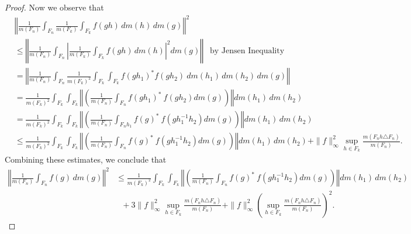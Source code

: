 \documentclass[10pt,a4paper]{amsart}
\newcommand{\abs}[1]{\left\vert#1\right\vert}
\newcommand{\norm}[1]{\left\Vert#1\right\Vert}
\begin{document}
\begin{proof}
\medskip
\noindent
Now we observe that 
\begin{align*}
&\norm{
\frac{1}{m(F_n)} \int_{F_n}
\frac{1}{m(F_k)} \int_{F_k} f(gh)\, dm(h)\, dm(g)
}^2\\
&\leq \norm{  \frac{1}{m(F_n)} \int_{F_n} \abs{
\frac{1}{m(F_k)} \int_{F_k} f(gh)\, dm(h)}^2 dm(g) } ~~\text{ by Jensen Inequality}\\
&= \norm{\frac{1}{m(F_n)} \int_{F_n}
\frac{1}{m(F_k)^2} \int_{F_k} \int_{F_k}
f( gh_1)^* f( gh_2) ~ dm(h_1)\, dm(h_2)\, dm(g) } \\
&= \frac{1}{m(F_k)^2} \int_{F_k} \int_{F_k}
\norm{ \left( \frac{1}{m(F_n)} \int_{F_n}
f( gh_1)^* ~ f( gh_2) dm(g) \right) }
dm(h_1)\, dm(h_2)\\
&= \frac{1}{m(F_k)^2} \int_{F_k} \int_{F_k}
\norm{ \left( \frac{1}{m(F_n)} \int_{F_nh_1}
f( g)^* ~ f( gh_{1}^{-1}h_2) dm(g) \right) }
dm(h_1)\, dm(h_2)\\
&\leq  \frac{1}{m(F_k)^2} \int_{F_k} \int_{F_k}
\norm{ \left( \frac{1}{m(F_n)} \int_{F_n}
f( g)^* ~ f(gh_{1}^{-1}h_2) dm(g) \right) }
dm(h_1)\, dm(h_2) + \|f\|_\infty^2 \sup_{h \in F_k}
\frac{m(F_nh \triangle F_n)}{m(F_n)}.
\end{align*}
Combining these estimates,  we conclude that
\begin{align*}
\norm{
\frac{1}{m(F_n)} \int_{F_n} f(g)\, dm(g)
}^2 &\leq 
\frac{1}{m(F_k)^2} \int_{F_k} \int_{F_k}
\norm{ \left( \frac{1}{m(F_n)} \int_{F_n}
f( g)^* ~ f( gh_{1}^{-1}h_2) dm(g) \right) }
dm(h_1)\, dm(h_2) \\
&~~~+ 3\|f\|_\infty^2 \sup_{h \in F_k}
\frac{m(F_nh \triangle F_n)}{m(F_n)}  +   \|f\|^2_\infty \left( \sup_{h \in F_k}
\frac{m(F_nh \triangle F_n)}{m(F_n)} \right)^2.
\end{align*}

\end{proof}
\end{document}

